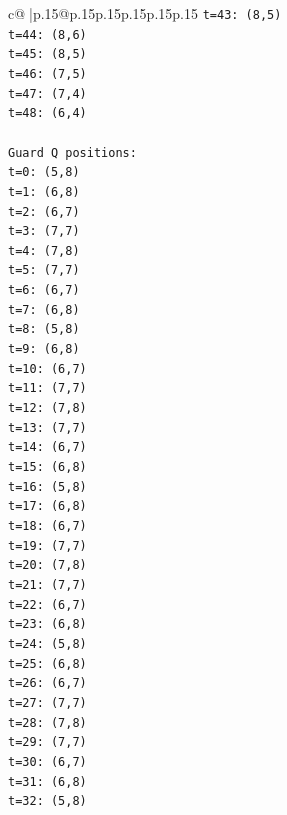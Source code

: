 \documentclass{article}
\begin{document}
{\begin{supertabular}{c@{$\;$}|p{.15\linewidth}@{}p{.15\linewidth}p{.15\linewidth}p{.15\linewidth}p{.15\linewidth}p{.15\linewidth}}
{{{\texttt{t=43: (8,5)} \\
\texttt{t=44: (8,6)} \\
\texttt{t=45: (8,5)} \\
\texttt{t=46: (7,5)} \\
\texttt{t=47: (7,4)} \\
\texttt{t=48: (6,4)} \\
\\ 
\texttt{Guard Q positions:} \\
\texttt{t=0: (5,8)} \\
\texttt{t=1: (6,8)} \\
\texttt{t=2: (6,7)} \\
\texttt{t=3: (7,7)} \\
\texttt{t=4: (7,8)} \\
\texttt{t=5: (7,7)} \\
\texttt{t=6: (6,7)} \\
\texttt{t=7: (6,8)} \\
\texttt{t=8: (5,8)} \\
\texttt{t=9: (6,8)} \\
\texttt{t=10: (6,7)} \\
\texttt{t=11: (7,7)} \\
\texttt{t=12: (7,8)} \\
\texttt{t=13: (7,7)} \\
\texttt{t=14: (6,7)} \\
\texttt{t=15: (6,8)} \\
\texttt{t=16: (5,8)} \\
\texttt{t=17: (6,8)} \\
\texttt{t=18: (6,7)} \\
\texttt{t=19: (7,7)} \\
\texttt{t=20: (7,8)} \\
\texttt{t=21: (7,7)} \\
\texttt{t=22: (6,7)} \\
\texttt{t=23: (6,8)} \\
\texttt{t=24: (5,8)} \\
\texttt{t=25: (6,8)} \\
\texttt{t=26: (6,7)} \\
\texttt{t=27: (7,7)} \\
\texttt{t=28: (7,8)} \\
\texttt{t=29: (7,7)} \\
\texttt{t=30: (6,7)} \\
\texttt{t=31: (6,8)} \\
\texttt{t=32: (5,8)} \\
}}}
\end{supertabular}}
\end{document}
